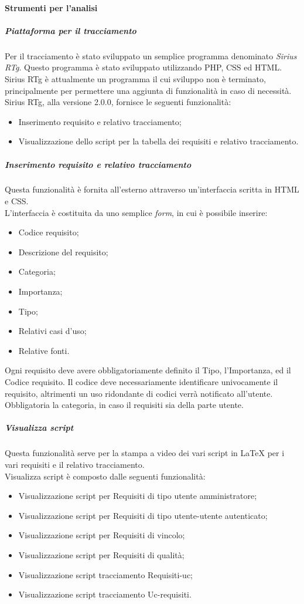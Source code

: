 \paragraph{Strumenti per l'analisi}
\subparagraph{Piattaforma per il tracciamento}
Per il tracciamento è stato sviluppato un semplice programma denominato \textit{Sirius RTg}. Questo programma è stato sviluppato utilizzando PHP, CSS ed HTML. Sirius RTg è attualmente un programma il cui sviluppo non è terminato, principalmente per permettere una aggiunta di funzionalità in caso di necessità. Sirius RTg, alla versione 2.0.0, fornisce le seguenti funzionalità:
\begin{itemize}
\item Inserimento requisito e relativo tracciamento;
\item Visualizzazione dello script per la tabella dei requisiti e relativo tracciamento.
\end{itemize}
\subparagraph{Inserimento requisito e relativo tracciamento}
Questa funzionalità è fornita all'esterno attraverso un'interfaccia scritta in HTML e CSS.\\
L'interfaccia è costituita da uno semplice \textit{form}, in cui è possibile inserire:
\begin{itemize}
\item Codice requisito;
\item Descrizione del requisito;
\item Categoria;
\item Importanza;
\item Tipo;
\item Relativi casi d'uso;
\item Relative fonti.
\end{itemize}
Ogni requisito deve avere obbligatoriamente definito il Tipo, l'Importanza, ed il Codice requisito. Il codice deve necessariamente identificare univocamente il requisito, altrimenti un uso ridondante di codici verrà notificato all'utente. Obbligatoria la categoria, in caso il requisiti sia della parte utente.
\subparagraph{Visualizza script}
Questa funzionalità serve per la stampa a video dei vari script in \LaTeX{} per i vari requisiti e il relativo tracciamento.\\ Visualizza script è composto dalle seguenti funzionalità:
	\begin{itemize}
		\item Visualizzazione script per Requisiti di tipo utente amministratore;
		\item Visualizzazione script per Requisiti di tipo utente-utente autenticato;
		\item Visualizzazione script per Requisiti di vincolo;
		\item Visualizzazione script per Requisiti di qualità;
		\item Visualizzazione script tracciamento Requisiti-uc;
		\item Visualizzazione script tracciamento Uc-requisiti.
	\end{itemize}
